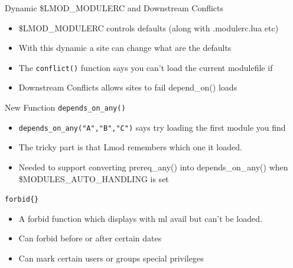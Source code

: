 \documentclass{beamer}
\begin{document}
\begin{frame}{Dynamic \$LMOD\_MODULERC and Downstream Conflicts}
  \begin{itemize}
    \item \$LMOD\_MODULERC controls defaults (along with .modulerc.lua etc)
    \item With this dynamic a site can change what are the defaults
    \item The \texttt{conflict()} function says you can't load the
      current modulefile if 
    \item Downstream Conflicts allows sites to fail depend\_on() loads 
  \end{itemize}
\end{frame}

\begin{frame}{New Function \texttt{depends\_on\_any()}}
  \begin{itemize}
    \item \texttt{depends\_on\_any("A","B","C")} says try loading the
      first module you find
    \item The tricky part is that Lmod remembers which one it loaded.
    \item Needed to support converting prereq\_any() into
      depends\_on\_any() when \$MODULES\_AUTO\_HANDLING is set
  \end{itemize}
\end{frame}


\begin{frame}{\texttt{forbid\{\}}}
  \begin{itemize}
    \item A forbid function which displays with ml avail but can't be loaded.
    \item Can forbid before or after certain dates
    \item Can mark certain users or groups special privileges
  \end{itemize}
\end{frame}
\end{document}
